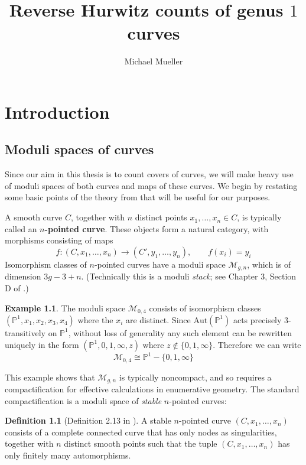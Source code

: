 \documentclass[thesis]{thesis-umich}           %
\title{Reverse Hurwitz counts of genus $1$ curves}
\author{Michael Mueller}
\newcommand{\Aut}{\text{Aut}}
\renewcommand{\P}{\mathbb P}
\theoremstyle{definition}
\newtheorem{dfn}[thm]{Definition}
\newtheorem{eg}[thm]{Example}
\begin{document}
\maketitle


\tableofcontents

\chapter{Introduction}

\section{Moduli spaces of curves}

Since our aim in this thesis is to count covers of curves, we
will make heavy use of moduli spaces of both curves and maps
of these curves. We begin by restating some basic points of the theory
from \cite{Moduli}
that will be useful for our purposes.

A smooth curve $C$, together with $n$ distinct
points $x_1,\dots,x_n\in C$, is typically called an {\bf $n$-pointed curve}.
These objects form a natural category, with morphisms
consisting of maps
\[
f:(C,x_1,\dots,x_n)\to (C',y_1,\dots,y_n),\qquad f(x_i)=y_i
\]
Isomorphism classes of $n$-pointed curves have a moduli space
$\mathcal M_{g,n}$, which is of dimension $3g-3+n$.
(Technically this is a moduli {\it stack}; see Chapter 3, Section D of
\cite{Moduli}.)

\begin{eg}
  The moduli space $\mathcal M_{0,4}$ consists of isomorphism classes
  $(\P^1,x_1,x_2,x_3,x_4)$ where the $x_i$ are distinct.
  Since $\Aut(\P^1)$ acts precisely $3$-transitively on $\P^1$,
  without loss of generality any such element can be rewritten uniquely
  in the form $(\P^1,0,1,\infty,z)$ where $z\notin\{0,1,\infty\}$.
  Therefore we can write
  \[
  \mathcal M_{0,4}\cong\P^1-\{0,1,\infty\}
  \]
\end{eg}

This example shows that $\mathcal M_{g,n}$ is typically noncompact,
and so requires a compactification for effective calculations in
enumerative geometry. The standard compactification is a moduli
space of {\it stable} $n$-pointed curves:

\begin{dfn}[Definition 2.13 in \cite{Moduli}]
  A stable $n$-pointed curve $(C,x_1,\dots,x_n)$ consists of
  a complete connected curve that has only nodes as singularities, together
  with $n$ distinct smooth points such that the tuple $(C,x_1,\dots,x_n)$
  has only finitely many automorphisms.
\end{dfn}
\end{document}
